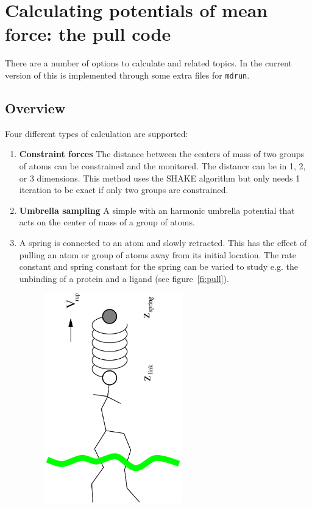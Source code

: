 \section{Calculating potentials of mean force: the pull code}
\label{sec:pull}
There are a number of options to calculate 
and related topics. In the current version of {\gromacs} this is
implemented through some extra files for {\tt mdrun}. 

\subsection{Overview}
Four different types of calculation are supported:

\begin{enumerate}
\item{\textbf{Constraint forces}} The distance between the centers of
mass of two groups of atoms can be constrained and the 
 monitored.
The distance can be in 1, 2, or 3 dimensions. This method
uses the SHAKE algorithm but only needs 1 iteration to be
exact if only two groups are constrained. 
\item{\textbf{Umbrella sampling}} A simple
 with an
harmonic umbrella potential that acts on the center of mass of a group
of atoms.
\item{\textbf{}} A spring is connected to an atom and
slowly retracted. This has the effect of pulling an atom or group of
atoms away from its initial location. The rate constant and spring
constant for the spring can be varied to study e.g. the unbinding of a
protein and a ligand (see figure~\ref{fi:pull}). 
\begin{figure}
\centerline{\includegraphics[width=6cm,angle=270]{plots/pull}}

\end{figure}
\end{enumerate}
